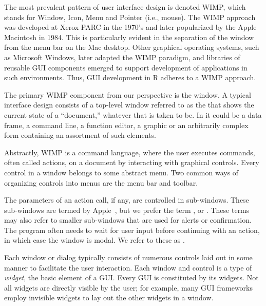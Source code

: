 

The most prevalent pattern of user interface design is denoted WIMP,
which stands for Window, Icon, Menu and Pointer (i.e., mouse). The
WIMP approach was developed at Xerox PARC in the 1970's and later
popularized by the Apple Macintosh in 1984. This is particularly
evident in the separation of the window from the menu bar on the Mac
desktop. Other graphical operating systems, such as Microsoft Windows,
later adapted the WIMP paradigm, and libraries of reusable GUI
components emerged to support development of applications in such
environments. Thus, GUI development in R adheres to a WIMP approach.

The primary WIMP component from our perspective is the window. A
typical interface design consists of a top-level window referred to as
the  that shows the current state of a
``document,'' whatever that is taken to be. In \R\/ it could be a data
frame, a command line, a function editor, a graphic or an arbitrarily
complex form containing an assortment of such elements. 


Abstractly, WIMP is a command language, where the user executes
commands, often called actions, on a document by interacting with
graphical controls. Every control in a window belongs to some abstract
menu. Two common ways of organizing controls into menus are the
menu bar and toolbar.

The parameters of an action call, if any, are controlled in
sub-windows. These sub-windows are termed 
by Apple~\citep{APPLE:HIG}, but we prefer the term ,
or . These terms may also refer to smaller
sub-windows that are used for alerts or confirmation. The program
often needs to wait for user input before continuing with an action,
in which case the window is modal. We refer to these as .

Each window or dialog typically consists of numerous controls laid out
in some manner to facilitate the user interaction. Each window and
control is a type of \textit{widget}, the basic element of a
GUI. Every GUI is constituted by its widgets. Not all widgets are
directly visible by the user; for example, many GUI frameworks employ
invisible widgets to lay out the other widgets in a window.

